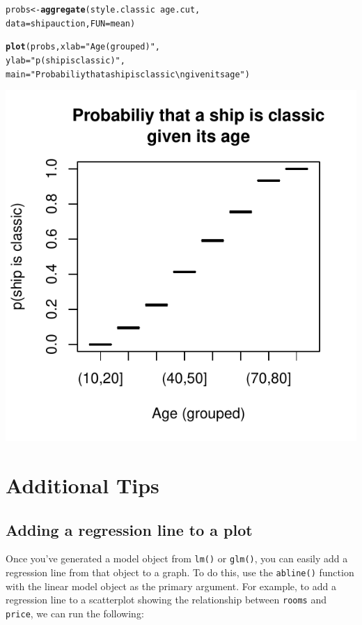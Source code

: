 \documentclass{tufte-book}\usepackage[]{graphicx}\usepackage[]{color}
\makeatletter
\def\maxwidth{ %
  \ifdim\Gin@nat@width>\linewidth
    \linewidth
  \else
    \Gin@nat@width
  \fi
}
\newcommand{\hlstr}[1]{\textcolor[rgb]{0.192,0.494,0.8}{#1}}%
\newcommand{\hlopt}[1]{\textcolor[rgb]{0,0,0}{#1}}%
\newcommand{\hlstd}[1]{\textcolor[rgb]{0.345,0.345,0.345}{#1}}%
\newcommand{\hlkwb}[1]{\textcolor[rgb]{0.69,0.353,0.396}{#1}}%
\newcommand{\hlkwc}[1]{\textcolor[rgb]{0.333,0.667,0.333}{#1}}%
\newcommand{\hlkwd}[1]{\textcolor[rgb]{0.737,0.353,0.396}{\textbf{#1}}}%
\newenvironment{kframe}{%
 \def\at@end@of@kframe{}%
 \ifinner\ifhmode%
  \def\at@end@of@kframe{\end{minipage}}%
  \begin{minipage}{\columnwidth}%
 \fi\fi%
 \def\FrameCommand##1{\hskip\@totalleftmargin \hskip-\fboxsep
 \colorbox{shadecolor}{##1}\hskip-\fboxsep
     \hskip-\linewidth \hskip-\@totalleftmargin \hskip\columnwidth}%
 \MakeFramed {\advance\hsize-\width
   \@totalleftmargin\z@ \linewidth\hsize
   \@setminipage}}%
 {\par\unskip\endMakeFramed%
 \at@end@of@kframe}
\newenvironment{knitrout}{}{} %
\makeatother
\begin{document}
\begin{footnotesize}
\begin{marginfigure}
\begin{tiny}
\begin{knitrout}
\begin{kframe}
\begin{alltt}
\hlstd{probs} \hlkwb{<-} \hlkwd{aggregate}\hlstd{(style.classic} \hlopt{~} \hlstd{age.cut,}
                   \hlkwc{data} \hlstd{= shipauction,} \hlkwc{FUN} \hlstd{= mean)}

\hlkwd{plot}\hlstd{(probs,} \hlkwc{xlab} \hlstd{=} \hlstr{"Age (grouped)"}\hlstd{,}
     \hlkwc{ylab} \hlstd{=} \hlstr{"p(ship is classic)"}\hlstd{,}
     \hlkwc{main} \hlstd{=} \hlstr{"Probabiliy that a ship is classic\textbackslash{}ngiven its age"}\hlstd{)}
\end{alltt}
\end{kframe}
\includegraphics[width=\maxwidth]{figure/unnamed-chunk-257-1} 

\end{knitrout}
\end{tiny}
\end{marginfigure}


\section{Additional Tips}

\subsection{Adding a regression line to a plot}


Once you've generated a model object from \texttt{lm()} or \texttt{glm()}, you can easily add a regression line from that object to a graph. To do this, use the \texttt{abline()} function with the linear model object as the primary argument. For example, to add a regression line to a scatterplot showing the relationship between \texttt{rooms} and \texttt{price}, we can run the following:


\end{footnotesize}
\end{document}
